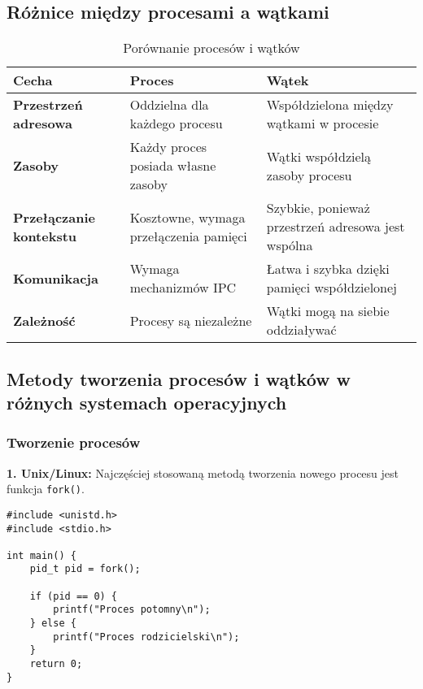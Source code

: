 \subsection{Różnice między procesami a wątkami}

\begin{table}[h]
    \centering
    \renewcommand{\arraystretch}{1.3} %
    \begin{tabularx}{\textwidth}{|l|X|X|}
        \hline
        \textbf{Cecha} & \textbf{Proces} & \textbf{Wątek} \\
        \hline
        \textbf{Przestrzeń adresowa} & Oddzielna dla każdego procesu & Współdzielona między wątkami w procesie \\
        \hline
        \textbf{Zasoby} & Każdy proces posiada własne zasoby & Wątki współdzielą zasoby procesu \\
        \hline
        \textbf{Przełączanie kontekstu} & Kosztowne, wymaga przełączenia pamięci & Szybkie, ponieważ przestrzeń adresowa jest wspólna \\
        \hline
        \textbf{Komunikacja} & Wymaga mechanizmów IPC & Łatwa i szybka dzięki pamięci współdzielonej \\
        \hline
        \textbf{Zależność} & Procesy są niezależne & Wątki mogą na siebie oddziaływać \\
        \hline
    \end{tabularx}
    \caption{Porównanie procesów i wątków}
\end{table}


\subsection{Metody tworzenia procesów i wątków w różnych systemach operacyjnych}

\subsubsection{Tworzenie procesów}

\textbf{1. Unix/Linux:}  
Najczęściej stosowaną metodą tworzenia nowego procesu jest funkcja \texttt{fork()}.
\begin{verbatim}
#include <unistd.h>
#include <stdio.h>

int main() {
    pid_t pid = fork();

    if (pid == 0) {
        printf("Proces potomny\n");
    } else {
        printf("Proces rodzicielski\n");
    }
    return 0;
}
\end{verbatim}

